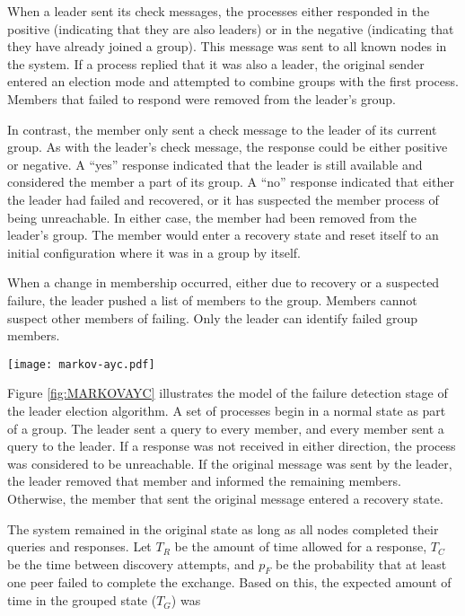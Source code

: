 When a leader sent its check messages, the processes either responded in the positive (indicating that they are also leaders) or in the
negative (indicating that they have already joined a group).
This message was sent to all known nodes in the system.
If a process replied that it was also a leader, the original sender entered an election mode and attempted to combine groups with the first process.
Members that failed to respond were removed from the leader's group.

In contrast, the member only sent a check message to the leader of its current group.
As with the leader's check message, the response could be either positive or negative.
A ``yes'' response indicated that the leader is still available and considered the member a part of its group.
A ``no'' response indicated that either the leader had failed and recovered, or it has suspected the member process of being unreachable.
In either case, the member had been removed from the leader's group.
The member would enter a recovery state and reset itself to an initial configuration where it was in a group by itself.

When a change in membership occurred, either due to recovery or a suspected failure, the leader pushed a list of members to the group.
Members cannot suspect other members of failing.
Only the leader can identify failed group members.

\begin{figure*}
\centering
\texttt{[image: markov-ayc.pdf]}
\caption{A diagram showing a partial Markov chain for failure detection}
\label{fig:MARKOVAYC}
\end{figure*}

Figure \ref{fig:MARKOVAYC} illustrates the model of the failure detection stage of the leader election algorithm.
A set of processes begin in a normal state as part of a group.
The leader sent a query to every member, and every member sent a query to the leader.
If a response was not received in either direction, the process was considered to be unreachable.
If the original message was sent by the leader, the leader removed that member and informed the remaining members.
Otherwise, the member that sent the original message entered a recovery state.

The system remained in the original state as long as all nodes completed their queries and responses.
Let $T_{R}$ be the amount of time allowed for a response, $T_{C}$ be the time between discovery attempts, and $p_{F}$ be the probability that at least one peer failed to complete the exchange.
Based on this, the expected amount of time in the grouped state ($T_{G}$) was

